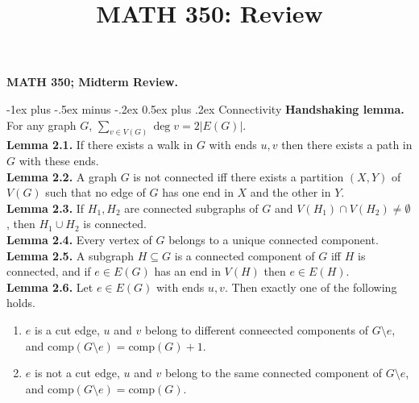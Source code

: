 \documentclass[10pt,landscape]{article}
\title{MATH 350: Review}
\makeatletter
\renewcommand{\section}{\@startsection{section}{1}{0mm}%
                                {-1ex plus -.5ex minus -.2ex}%
                                {0.5ex plus .2ex}%
                                {\normalfont\large\bfseries}}
\makeatother
\begin{document}
\raggedright
\footnotesize

\begin{center}
     \Large{\textbf{MATH 350; Midterm Review.}} \\
\end{center}
\begin{multicols}{3}
\setlength{\premulticols}{1pt}
\setlength{\postmulticols}{1pt}
\setlength{\multicolsep}{1pt}
\setlength{\columnsep}{2pt}

\section{Connectivity}
\textbf{Handshaking lemma.} For any graph \( G \), \( \sum_{v \in V(G)}^{}\deg v = 2|E(G)|. \) \\
\textbf{Lemma 2.1.} If there exists a walk in \( G \) with ends \( u,v \) then there exists a path in \( G \) with these ends. \\
\textbf{Lemma 2.2.} A graph \( G \) is not connected iff there exists a partition \( (X,Y) \) of \( V(G) \) such that no edge of \( G \) has one end in \( X \) and the other in \( Y \). \\
\textbf{Lemma 2.3.} If \( H_1, H_2 \) are connected subgraphs of \( G \) and \( V(H_1) \cap V(H_2) \neq \emptyset  \), then \( H_1 \cup H_2 \) is connected. \\
\textbf{Lemma 2.4.} Every vertex of \( G \) belongs to a unique connected component. \\
\textbf{Lemma 2.5.} A subgraph \( H \subseteq G \) is a connected component of \( G \) iff \( H \) is connected, and if \( e \in E(G) \) has an end in \( V(H) \) then \( e \in E(H). \) \\
\textbf{Lemma 2.6.} Let \( e \in E(G) \) with ends \( u,v \). Then exactly one of the following holds.
\begin{enumerate}
	\item \( e \) is a cut edge, \( u \) and \( v \) belong to different conneected components of \( G \setminus e \), and \( \mbox{comp}(G \setminus e) = \mbox{comp}(G) + 1.\)
	\item \( e \) is not a cut edge, \( u \) and \( v \) belong to the same connected component of \( G \setminus e \), and \( \mbox{comp}(G\setminus e ) = \mbox{comp}(G). \) 
\end{enumerate}

\end{multicols}
\end{document}

